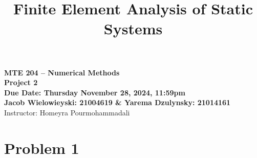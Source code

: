 \documentclass[8pt]{article}
\title{Finite Element Analysis of Static Systems}
\begin{document}
 

\begin{titlepage}
    \begin{center}
        \vspace*{1cm}
        
        {\Large \textbf{MTE 204 – Numerical Methods}}\\[0.5cm]
        {\Large \textbf{Project 2}}\\[1.5cm]
        
        {\large \textbf{Due Date: Thursday November 28, 2024, 11:59pm}}\\[2cm]
        
        {\large \textbf{Jacob Wielowieyski: 21004619 \& Yarema Dzulynsky: 21014161 }}\\[0.5cm]
        
        
        {\large Instructor: Homeyra Pourmohammadali}\\[0.5cm]
        
        \vfill
    \end{center}
\end{titlepage}


\section{Problem 1}
\label{sec:Problem 1}
\end{document}
